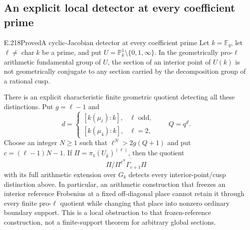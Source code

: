\subsection{An explicit local detector at every coefficient prime}


\begin{result}{E.218}{Proved}{A cyclic-Jacobian detector at every coefficient prime}
Let $k=\mathbb F_q$, let $\ell\ne\operatorname{char}k$ be a prime, and put
$U=\mathbb P^1_k\setminus\{0,1,\infty\}$. In the geometrically pro-$\ell$
arithmetic fundamental group of $U$, the section of an interior point of
$U(k)$ is not geometrically conjugate to any section carried by the
 decomposition group of a rational cusp.

There is an explicit characteristic finite geometric quotient detecting all
these distinctions. Put $g=\ell-1$ and
\[
 d=\begin{cases}[k(\mu_\ell):k],&\ell\text{ odd},\\
 [k(\mu_4):k],&\ell=2,\end{cases}
 \qquad Q=q^d.
 \tag{E.218.1}
\]
Choose an integer $N\ge1$ such that $\ell^N>2g(Q+1)$ and put
$c=(\ell-1)N-1$. If $\Pi=\pi_1(U_{\bar k})^{(\ell)}$, then the quotient
\[
 \Pi\big/\overline{\Pi^{\ell^N}\Gamma_{c+1}\Pi}
 \tag{E.218.2}
\]
with its full arithmetic extension over $G_k$ detects every interior-point/cusp
distinction above. In particular, an arithmetic construction that freezes an
interior reference Frobenius at a fixed off-diagonal place cannot retain it
through every finite pro-$\ell$ quotient while changing that place into
nonzero ordinary boundary support. This is a local obstruction to that
frozen-reference construction, not a finite-support theorem for arbitrary
global sections.
\end{result}

